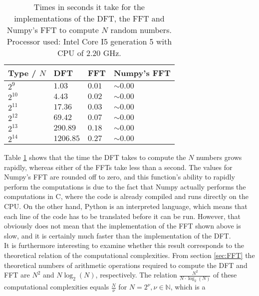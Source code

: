 \begin{table}[H]
\centering
\begin{tabular}{|l|l|l|l|}
\hline
Type / $N$ & DFT	   & FFT 	 & Numpy's FFT \\ \hline
$2^9$  	   & $1.03$    & $0.01$  & $\sim 0.00$ \\ \hline
$2^{10}$   & $4.43$    & $0.02$  & $\sim 0.00$ \\ \hline
$2^{11}$   & $17.36$   & $0.03$  & $\sim 0.00$ \\ \hline
$2^{12}$   & $69.42$   & $0.07$  & $\sim 0.00$ \\ \hline
$2^{13}$   & $290.89$  & $0.18$  & $\sim 0.00$ \\ \hline
$2^{14}$   & $1206.85$ & $0.27$  & $\sim 0.00$ \\ \hline
\end{tabular}
\caption{Times in seconds it take for the implementations of the DFT, the FFT and Numpy's FFT to compute $N$ random numbers. Processor used: Intel Core I5 generation 5 with CPU of 2.20 GHz.}
\label{tab:FTcompare}
\end{table}

Table \ref{tab:FTcompare} shows that the time the DFT takes to compute the $N$ numbers grows rapidly, whereas either of the FFTs take less than a second. The values for Numpy's FFT are rounded off to zero, and this function's ability to rapidly perform the computations is due to the fact that Numpy actually performs the computations in C, where the code is already compiled and runs directly on the CPU. On the other hand, Python is an interpreted language, which means that each line of the code has to be translated before it can be run. However, that obviously does not mean that the implementation of the FFT shown above is slow, and it is certainly much faster than the implementation of the DFT. \\
It is furthermore interesting to examine whether this result corresponds to the theoretical relation of the computational complexities. From section \ref{sec:FFT} the theoretical numbers of arithmetic operations required to compute the DFT and FFT are $N^2$ and $N\log_2(N)$, respectively. The relation $\frac{N^2}{N \cdot \log_2(N)}$ of these computational complexities equals $\frac{N}{\nu}$ for $N = 2^\nu, \nu \in \mathbb{N}$, which is a 


